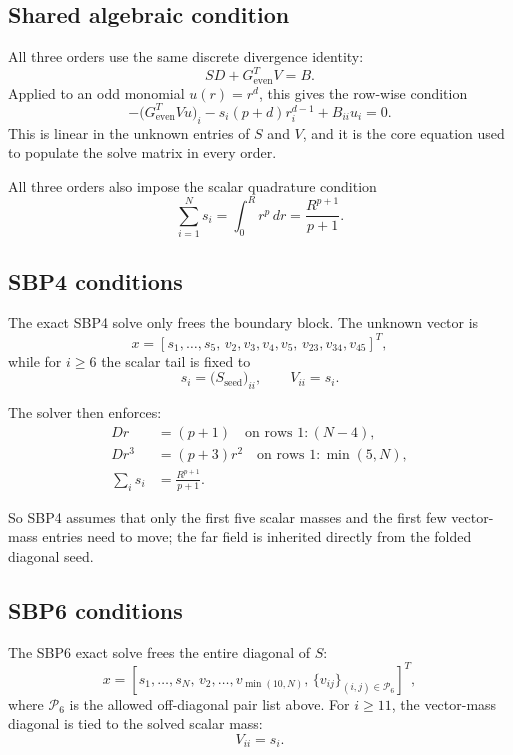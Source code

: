 \documentclass[
  aps,
  pre,
  reprint,
  superscriptaddress,
  nofootinbib
]{revtex4-2}
\begin{document}
\subsection{Shared algebraic condition}
All three orders use the same discrete divergence identity:
\begin{equation}
  S D + G_{\mathrm{even}}^{T} V = B.
\end{equation}
Applied to an odd monomial $u(r)=r^d$, this gives the row-wise condition
\begin{equation}
  -\bigl(G_{\mathrm{even}}^{T} V u\bigr)_i
  - s_i (p+d) r_i^{d-1}
  + B_{ii} u_i = 0.
  \label{eq:div-row}
\end{equation}
This is linear in the unknown entries of $S$ and $V$, and it is the core equation used
to populate the solve matrix in every order.

All three orders also impose the scalar quadrature condition
\begin{equation}
  \sum_{i=1}^{N} s_i = \int_0^R r^p\,dr = \frac{R^{p+1}}{p+1}.
  \label{eq:quad}
\end{equation}

\subsection{SBP4 conditions}
The exact SBP4 solve only frees the boundary block.
The unknown vector is
\begin{equation}
  x =
  [s_1,\dots,s_5,\,
   v_2,v_3,v_4,v_5,\,
   v_{23},v_{34},v_{45}]^{T},
\end{equation}
while for $i \ge 6$ the scalar tail is fixed to
\begin{equation}
  s_i = \bigl(S_{\mathrm{seed}}\bigr)_{ii},
  \qquad
  V_{ii}=s_i.
\end{equation}

The solver then enforces:
\begin{align}
  D r &= (p+1) \quad \text{on rows } 1:(N-4), \\
  D r^3 &= (p+3) r^2 \quad \text{on rows } 1:\min(5,N), \\
  \sum_i s_i &= \frac{R^{p+1}}{p+1}.
\end{align}

So SBP4 assumes that only the first five scalar masses and the first few vector-mass
entries need to move; the far field is inherited directly from the folded diagonal seed.

\subsection{SBP6 conditions}
The SBP6 exact solve frees the entire diagonal of $S$:
\begin{equation}
  x =
  [s_1,\dots,s_N,\,
   v_2,\dots,v_{\min(10,N)},\,
   \{v_{ij}\}_{(i,j)\in\mathcal{P}_6}]^{T},
\end{equation}
where $\mathcal{P}_6$ is the allowed off-diagonal pair list above.
For $i \ge 11$, the vector-mass diagonal is tied to the solved scalar mass:
\begin{equation}
  V_{ii} = s_i.
\end{equation}
\end{document}
